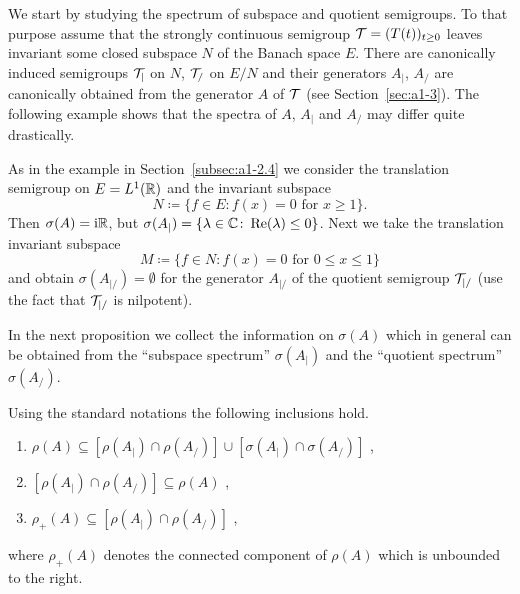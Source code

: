 We start by studying the spectrum of subspace and quotient semigroups.
To that purpose assume that the strongly continuous semigroup $\TT = (T(t))_{t \geq 0}$ leaves invariant some closed subspace $N$ of the Banach space $E$.
There are canonically induced semigroups $\mathcal{T}_{|}$ on $N$, \resp $\mathcal{T}_{/}$ on $E/N$ and their generators $A_{|}$, \resp $A_{/}$ are canonically obtained from the generator $A$ of\/ $\mathcal{T}$ (see Section~\ref{sec:a1-3}).
The following example shows that the spectra of\/ $A$, $A_{|}$ and $A_{/}$ may differ quite drastically.
\begin{example}\label{ex:a3-4.1}
As in the example in Section~\ref{subsec:a1-2.4} we consider the translation semigroup on $E = L^{1}(\mathbb{R})$ and the 
invariant subspace 
%
\[
	N \coloneq \{f \in E \colon f(x) = 0 \text{ for } x \geq 1\} .
\]
%
Then $\sigma(A) = \mathrm{i}\mathbb{R}$, but $\sigma(A_{|}) = \{\lambda \in \C \colon \Re(\lambda) \leq 0\}$.
Next we take the translation invariant subspace 
%
\[
	M \coloneq \{f \in N \colon f(x) = 0 \text{ for } 0 \leq x \leq 1\}
\]
%
and obtain $\sigma(A_{|/}) = \emptyset$ for the generator $A_{|/}$ of the quotient semigroup $\mathcal{T}_{|/}$ (use the fact that $\mathcal{T}_{|/}$ is nilpotent).
\end{example}
In the next proposition we collect the information on $\sigma(A)$ which in general can be obtained from the \enquote{subspace spectrum} $\sigma(A_{|})$ and the \enquote{quotient spectrum} $\sigma(A_{/})$.
\begin{proposition}\label{prop:a3-4.2}
Using the standard notations the following inclusions hold.
\begin{enumerate}[\upshape (i)]
\item 
$\rho(A) \subseteq [\rho(A_{|}) \cap \rho(A_{/})] \cup [\sigma(A_{|}) \cap \sigma(A_{/})]$ ,

\item 
$[\rho(A_{|}) \cap \rho(A_{/})] \subseteq \rho(A) $ ,

\item 
$\rho_{+}(A) \subseteq [\rho(A_{|}) \cap \rho(A_{/})]$ ,
\end{enumerate}
 where $\rho_{+}(A)$ denotes the connected component of\/ $\rho(A)$ which is unbounded to the right.

\end{proposition}
